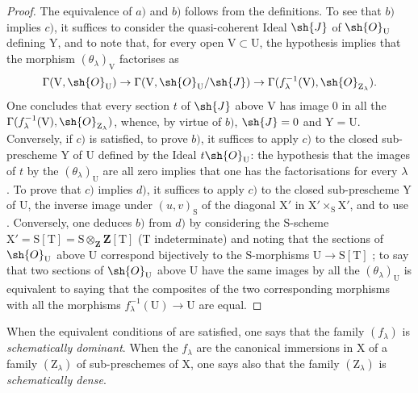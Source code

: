 \begin{proof}
The equivalence of $a)$ and $b)$ follows from the definitions.
To see that $b)$ implies $c)$, it suffices to consider the quasi-coherent Ideal $\sh{J}$ of $\sh{O}_\mathrm{U}$ defining $\mathrm{Y}$, and to note that, for every open $\mathrm{V}\subset\mathrm{U}$, the hypothesis implies that the morphism $(\theta_\lambda)_\mathrm{V}$ factorises as
\[
  \Gamma(\mathrm{V},\sh{O}_\mathrm{U})\to\Gamma(\mathrm{V},\sh{O}_\mathrm{U}/\sh{J})\to\Gamma(f_\lambda^{-1}(\mathrm{V}),\sh{O}_{\mathrm{Z}_\lambda}).
\]
One concludes that every section $t$ of $\sh{J}$ above $\mathrm{V}$ has image $0$ in all the $\Gamma(f_\lambda^{-1}(\mathrm{V}),\sh{O}_{\mathrm{Z}_\lambda})$, whence, by virtue of $b)$, $\sh{J}=0$ and $\mathrm{Y}=\mathrm{U}$.
Conversely, if $c)$ is satisfied, to prove $b)$, it suffices to apply $c)$ to the closed sub-prescheme $\mathrm{Y}$ of $\mathrm{U}$ defined by the Ideal $t\sh{O}_\mathrm{U}$: the hypothesis that the images of $t$ by the $(\theta_\lambda)_\mathrm{U}$ are all zero implies that one has the factorisations  for every $\lambda$ .
To prove that $c)$ implies $d)$, it suffices to apply $c)$ to the closed sub-prescheme $\mathrm{Y}$ of $\mathrm{U}$, the inverse image under $(u,v)_\mathrm{S}$ of the diagonal $\mathrm{X}'$ in $\mathrm{X}'\times_\mathrm{S}\mathrm{X}'$, and to use .
Conversely, one deduces $b)$ from $d)$ by considering the $\mathrm{S}$-scheme $\mathrm{X}'=\mathrm{S}[\mathrm{T}]=\mathrm{S}\otimes_\mathbf{Z}\mathbf{Z}[\mathrm{T}]$ ($\mathrm{T}$ indeterminate) and noting that the sections of $\sh{O}_\mathrm{U}$ above $\mathrm{U}$ correspond bijectively to the $\mathrm{S}$-morphisms $\mathrm{U}\to\mathrm{S}[\mathrm{T}]$ ; to say that two sections of $\sh{O}_\mathrm{U}$ above $\mathrm{U}$ have the same images by all the $(\theta_\lambda)_\mathrm{U}$ is equivalent to saying that the composites of the two corresponding morphisms with all the morphisms $f_\lambda^{-1}(\mathrm{U})\to\mathrm{U}$ are equal.
\end{proof}

\begin{definition}[11.10.2]
\label{IV.11.10.2}
When the equivalent conditions of  are satisfied, one says that the family $(f_\lambda)$ is \emph{schematically dominant}.
When the $f_\lambda$ are the canonical immersions in $\mathrm{X}$ of a family $(\mathrm{Z}_\lambda)$ of sub-preschemes of $\mathrm{X}$, one says also that the family $(\mathrm{Z}_\lambda)$ is \emph{schematically dense}.
\end{definition}

